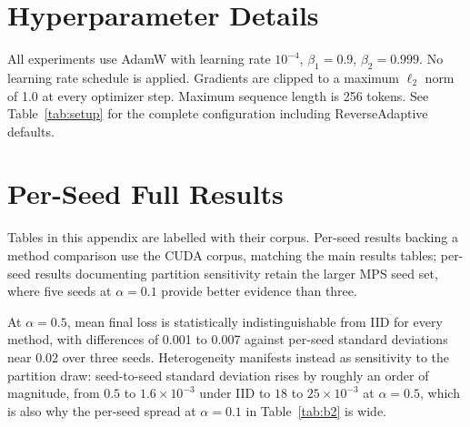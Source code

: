 \appendix
\section{Hyperparameter Details}
\label{app:hyper}
All experiments use AdamW \citep{loshchilov2019decoupled} with learning rate $10^{-4}$, $\beta_1{=}0.9$, $\beta_2{=}0.999$. No learning rate schedule is applied. Gradients are clipped to a maximum $\ell_2$ norm of 1.0 at every optimizer step. Maximum sequence length is 256 tokens. See Table~\ref{tab:setup} for the complete configuration including ReverseAdaptive defaults.

\section{Per-Seed Full Results}
\label{app:perseed}
Tables in this appendix are labelled with their corpus. Per-seed results backing a method comparison use the CUDA corpus, matching the main results tables; per-seed results documenting partition sensitivity retain the larger MPS seed set, where five seeds at $\alpha{=}0.1$ provide better evidence than three.

At $\alpha{=}0.5$, mean final loss is statistically indistinguishable from IID for every method, with differences of 0.001 to 0.007 against per-seed standard deviations near 0.02 over three seeds. Heterogeneity manifests instead as sensitivity to the partition draw: seed-to-seed standard deviation rises by roughly an order of magnitude, from $0.5$ to $1.6 \times 10^{-3}$ under IID to $18$ to $25 \times 10^{-3}$ at $\alpha{=}0.5$, which is also why the per-seed spread at $\alpha{=}0.1$ in Table~\ref{tab:b2} is wide.

